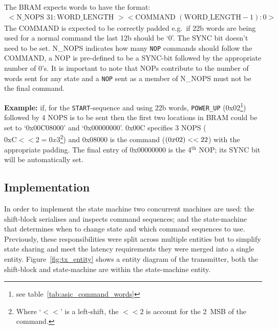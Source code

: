 The BRAM expects words to have the format:
\begin{align}\label{fmt:tx_bram}
  <\text{N\_NOPS } 31:\text{WORD\_LENGTH }><\text{COMMAND } (\text{WORD\_LENGTH} - 1):0>
\end{align}
The COMMAND is expected to be correctly padded e.g.\ if 22b words are being used for a normal command the last 12b should be `0'. The SYNC bit doesn't need to be set. N\_NOPS indicates how many \texttt{NOP} commands should follow the COMMAND, a NOP is pre-defined to be a SYNC-bit followed by the appropriate number of 0's. It is important to note that NOPs contribute to the number of words sent for any state and a \texttt{NOP} sent as a member of N\_NOPS must not be the final command.

\textbf{Example:} if, for the \texttt{START}-sequence and using 22b words, \texttt{POWER\_UP} (0x02\footnote{see table~\ref{tab:asic_command_words}}) followed by 4 NOPS is to be sent then the first two locations in BRAM could be set to `0x00C08000' and `0x00000000'. 0x00C specifies 3 NOPS (\(\text{0xC}<<2 = 0x3\)\footnote{Where `\(<<\)' is a left-shift, the \( <<2 \) is account for the 2~MSB of the command.}) and 0x08000 is the command (\(\text(0x02) << 22 \)) with the appropriate padding. The final entry of 0x00000000 is the 4\(^{\text{th}}\) NOP; its SYNC bit will be automatically set.
\subsection{Implementation} %
\label{sub:tx_implementation}

In order to implement the state machine two concurrent machines are used: the shift-block serialises and inspects command sequences; and the state-machine that determines when to change state and which command sequences to use. Previously, these responsibilities were split across multiple entities but to simplify state sharing and meet the latency requirements they were merged into a single entity. Figure~\ref{fig:tx_entity} shows a entity diagram of the transmitter, both the shift-block and state-machine are within the state-machine entity.
    

